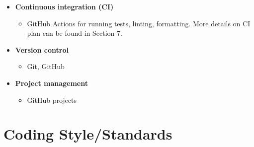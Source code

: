 \documentclass{article}
\begin{document}
\begin{itemize}
    \item \textbf{Continuous integration (CI)}
    \begin{itemize}
        \item GitHub Actions for running tests, linting, formatting. More details on CI plan can be found in Section 7.
    \end{itemize}
    
    \item \textbf{Version control}
    \begin{itemize}
        \item Git, GitHub
    \end{itemize}
    
    \item \textbf{Project management}
    \begin{itemize}
        \item GitHub projects
    \end{itemize}
\end{itemize}

\section{Coding Style/Standards}
\end{document}
